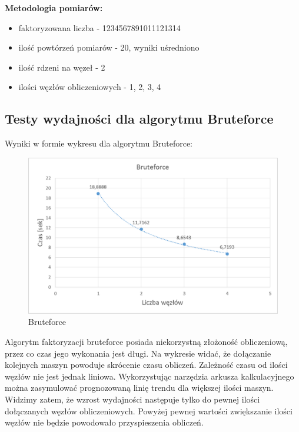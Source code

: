 \documentclass{article}
\begin{document}
\textbf{Metodologia pomiarów:}
\begin{itemize}
\item faktoryzowana liczba - 1234567891011121314
\item ilość powtórzeń pomiarów - 20, wyniki uśredniono
\item ilość rdzeni na węzeł - 2
\item ilości węzłów obliczeniowych - 1, 2, 3, 4
\end{itemize}

\subsection{Testy wydajności dla algorytmu Bruteforce}
Wyniki w formie wykresu dla algorytmu Bruteforce:
\begin{figure}[h!]
    \includegraphics[width=\linewidth]{Bruteforce.png}
    \caption{Bruteforce}
    \label{fig:userpagescr}
\end{figure}
\newpage
Algorytm faktoryzacji bruteforce posiada niekorzystną złożoność obliczeniową, przez co czas jego wykonania jest długi. Na wykresie widać, że dołączanie kolejnych maszyn powoduje skrócenie czasu obliczeń. Zależność czasu od ilości węzłów nie jest jednak liniowa. Wykorzystując narzędzia arkusza kalkulacyjnego można zasymulować prognozowaną linię trendu dla większej ilości maszyn. Widzimy zatem, że wzrost wydajności następuje tylko do pewnej ilości dołączanych węzłów obliczeniowych. Powyżej pewnej wartości zwiększanie ilości węzłów nie będzie powodowało przyspieszenia obliczeń.
\end{document}
